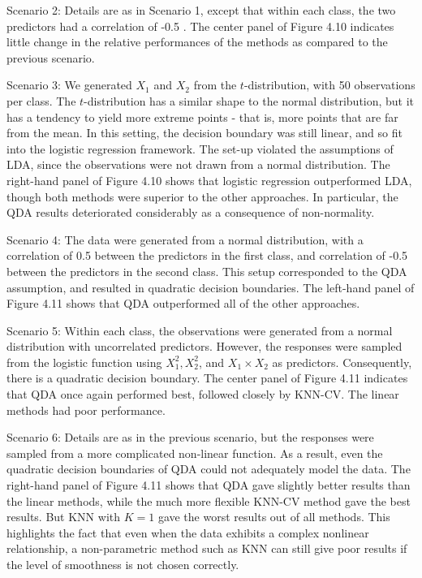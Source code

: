 \documentclass[10pt]{article}
\begin{document}
Scenario 2: Details are as in Scenario 1, except that within each class, the two predictors had a correlation of -0.5 . The center panel of Figure 4.10 indicates little change in the relative performances of the methods as compared to the previous scenario.

Scenario 3: We generated $X_{1}$ and $X_{2}$ from the $t$-distribution, with 50 observations per class. The $t$-distribution has a similar shape to the normal distribution, but it has a tendency to yield more extreme points - that is, more points that are far from the mean. In this setting, the decision boundary was still linear, and so fit into the logistic regression framework. The set-up violated the assumptions of LDA, since the observations were not drawn from a normal distribution. The right-hand panel of Figure 4.10 shows that logistic regression outperformed LDA, though both methods were superior to the other approaches. In particular, the QDA results deteriorated considerably as a consequence of non-normality.

Scenario 4: The data were generated from a normal distribution, with a correlation of 0.5 between the predictors in the first class, and correlation of -0.5 between the predictors in the second class. This setup corresponded to the QDA assumption, and resulted in quadratic decision boundaries. The left-hand panel of Figure 4.11 shows that QDA outperformed all of the other approaches.

Scenario 5: Within each class, the observations were generated from a normal distribution with uncorrelated predictors. However, the responses were sampled from the logistic function using $X_{1}^{2}, X_{2}^{2}$, and $X_{1} \times X_{2}$ as predictors. Consequently, there is a quadratic decision boundary. The center panel of Figure 4.11 indicates that QDA once again performed best, followed closely by KNN-CV. The linear methods had poor performance.


Scenario 6: Details are as in the previous scenario, but the responses were sampled from a more complicated non-linear function. As a result, even the quadratic decision boundaries of QDA could not adequately model the data. The right-hand panel of Figure 4.11 shows that QDA gave slightly better results than the linear methods, while the much more flexible KNN-CV method gave the best results. But KNN with $K=1$ gave the worst results out of all methods. This highlights the fact that even when the data exhibits a complex nonlinear relationship, a non-parametric method such as KNN can still give poor results if the level of smoothness is not chosen correctly.
\end{document}
